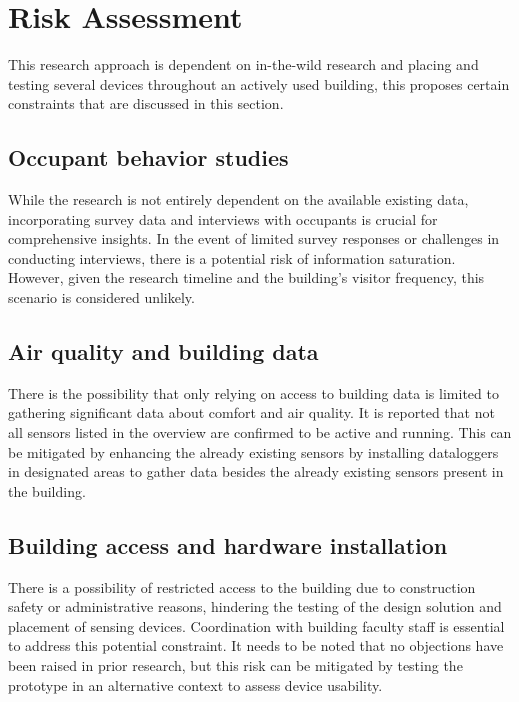 \section{Risk Assessment}

This research approach is dependent on in-the-wild research and placing and testing several devices throughout an actively used building, this proposes certain constraints that are discussed in this section.

\subsection{Occupant behavior studies}

While the research is not entirely dependent on the available existing data, incorporating survey data and interviews with occupants is crucial for comprehensive insights. In the event of limited survey responses or challenges in conducting interviews, there is a potential risk of information saturation. However, given the research timeline and the building's visitor frequency, this scenario is considered unlikely.

\subsection{Air quality and building data}

There is the possibility that only relying on access to building data is limited to gathering significant data about comfort and air quality. It is reported that not all sensors listed in the overview are confirmed to be active and running. This can be mitigated by enhancing the already existing sensors by installing dataloggers in designated areas to gather data besides the already existing sensors present in the building.

\subsection{Building access and hardware installation}

There is a possibility of restricted access to the building due to construction safety or administrative reasons, hindering the testing of the design solution and placement of sensing devices. Coordination with building faculty staff is essential to address this potential constraint. It needs to be noted that no objections have been raised in prior research, but this risk can be mitigated by testing the prototype in an alternative context to assess device usability.


